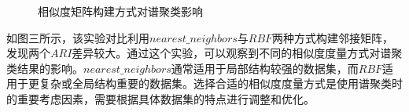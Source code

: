 \documentclass[11pt]{scrartcl}
\begin{document}
\begin{figure}[htbp]
\centering
{}
\quad
{}
\caption{相似度矩阵构建方式对谱聚类影响}
\end{figure}
如图三所示，该实验对比利用$nearest\_neighbors$与$RBF$两种方式构建邻接矩阵，发现两个$ARI$差异较大。通过这个实验，可以观察到不同的相似度度量方式对谱聚类结果的影响。$nearest\_neighbors$通常适用于局部结构较强的数据集，而$RBF$适用于更复杂或全局结构重要的数据集。选择合适的相似度度量方式是使用谱聚类时的重要考虑因素，需要根据具体数据集的特点进行调整和优化。
\end{document}
